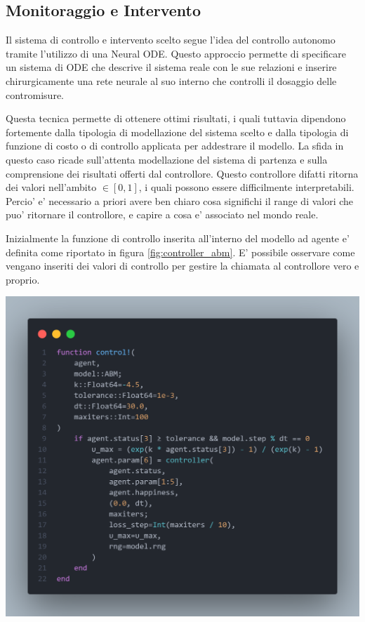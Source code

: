 \subsection{Monitoraggio e Intervento}
Il sistema di controllo e intervento scelto segue l'idea del controllo autonomo tramite l'utilizzo di 
una Neural ODE. Questo approccio permette di specificare un sistema di ODE che descrive il sistema reale 
con le sue relazioni e inserire chirurgicamente una rete neurale al suo interno che controlli il 
dosaggio delle contromisure. \cite{B_ttcher_2022} \cite{innes2019differentiable} \cite{sandoval2022neural}

Questa tecnica permette di ottenere ottimi risultati, i quali tuttavia dipendono fortemente dalla 
tipologia di modellazione del sistema scelto e dalla tipologia di funzione di costo o di controllo 
applicata per addestrare il modello. La sfida in questo caso ricade sull'attenta modellazione del 
sistema di partenza e sulla comprensione dei risultati offerti dal controllore. Questo controllore 
difatti ritorna dei valori nell'ambito $\in[0, 1]$, i quali possono essere difficilmente interpretabili.
Percio' e' necessario a priori avere ben chiaro cosa significhi il range di valori che puo' ritornare
il controllore, e capire a cosa e' associato nel mondo reale. 

Inizialmente la funzione di controllo inserita all'interno del modello ad agente e' definita 
come riportato in figura \ref{fig:controller_abm}. E' possibile osservare come vengano inseriti dei valori di 
controllo per gestire la chiamata al controllore vero e proprio.

\begin{minipage}{\linewidth}
	\centering
	\includegraphics[width=\textwidth]{img/controller_neuralode.png}
	\label{fig:controller_abm}
\end{minipage}

